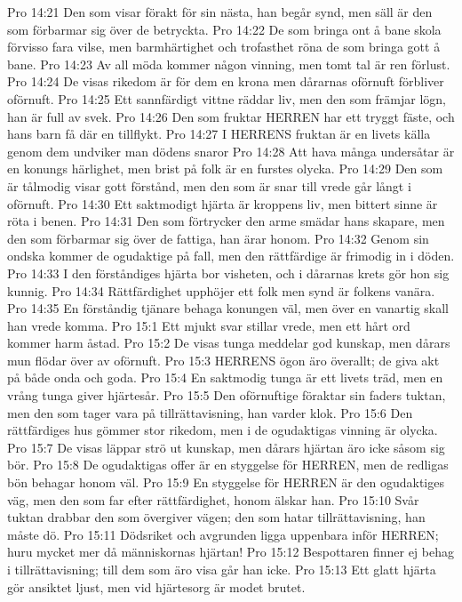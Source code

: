 Pro 14:21  Den som visar förakt för sin nästa, han begår synd, men säll är den som förbarmar sig över de betryckta.
Pro 14:22  De som bringa ont å bane skola förvisso fara vilse, men barmhärtighet och trofasthet röna de som bringa gott å bane.
Pro 14:23  Av all möda kommer någon vinning, men tomt tal är ren förlust.
Pro 14:24  De visas rikedom är för dem en krona men dårarnas oförnuft förbliver oförnuft.
Pro 14:25  Ett sannfärdigt vittne räddar liv, men den som främjar lögn, han är full av svek.
Pro 14:26  Den som fruktar HERREN har ett tryggt fäste, och hans barn få där en tillflykt.
Pro 14:27  I HERRENS fruktan är en livets källa genom dem undviker man dödens snaror
Pro 14:28  Att hava många undersåtar är en konungs härlighet, men brist på folk är en furstes olycka.
Pro 14:29  Den som är tålmodig visar gott förstånd, men den som är snar till vrede går långt i oförnuft.
Pro 14:30  Ett saktmodigt hjärta är kroppens liv, men bittert sinne är röta i benen.
Pro 14:31  Den som förtrycker den arme smädar hans skapare, men den som förbarmar sig över de fattiga, han ärar honom.
Pro 14:32  Genom sin ondska kommer de ogudaktige på fall, men den rättfärdige är frimodig in i döden.
Pro 14:33  I den förståndiges hjärta bor visheten, och i dårarnas krets gör hon sig kunnig.
Pro 14:34  Rättfärdighet upphöjer ett folk men synd är folkens vanära.
Pro 14:35  En förståndig tjänare behaga konungen väl, men över en vanartig skall han vrede komma.
Pro 15:1  Ett mjukt svar stillar vrede, men ett hårt ord kommer harm åstad.
Pro 15:2  De visas tunga meddelar god kunskap, men dårars mun flödar över av oförnuft.
Pro 15:3  HERRENS ögon äro överallt; de giva akt på både onda och goda.
Pro 15:4  En saktmodig tunga är ett livets träd, men en vrång tunga giver hjärtesår.
Pro 15:5  Den oförnuftige föraktar sin faders tuktan, men den som tager vara på tillrättavisning, han varder klok.
Pro 15:6  Den rättfärdiges hus gömmer stor rikedom, men i de ogudaktigas vinning är olycka.
Pro 15:7  De visas läppar strö ut kunskap, men dårars hjärtan äro icke såsom sig bör.
Pro 15:8  De ogudaktigas offer är en styggelse för HERREN, men de redligas bön behagar honom väl.
Pro 15:9  En styggelse för HERREN är den ogudaktiges väg, men den som far efter rättfärdighet, honom älskar han.
Pro 15:10  Svår tuktan drabbar den som övergiver vägen; den som hatar tillrättavisning, han måste dö.
Pro 15:11  Dödsriket och avgrunden ligga uppenbara inför HERREN; huru mycket mer då människornas hjärtan!
Pro 15:12  Bespottaren finner ej behag i tillrättavisning; till dem som äro visa går han icke.
Pro 15:13  Ett glatt hjärta gör ansiktet ljust, men vid hjärtesorg är modet brutet.
